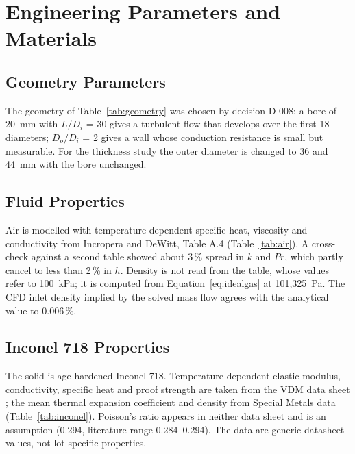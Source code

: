 \chapter{Engineering Parameters and Materials}\label{ch:params}

\section{Geometry Parameters}
The geometry of Table~\ref{tab:geometry} was chosen by decision D-008: a bore of 20~mm with $L/D_i$ = 30 gives a turbulent flow that
develops over the first 18 diameters; $D_o/D_i$ = 2 gives a wall whose conduction resistance is small but measurable. For the thickness
study the outer diameter is changed to 36 and 44~mm with the bore unchanged.

\section{Fluid Properties}
Air is modelled with temperature-dependent specific heat, viscosity and conductivity from Incropera and DeWitt, Table A.4 \cite{incropera}
(Table~\ref{tab:air}). A cross-check against a second table \cite{cengel} showed about 3\,\% spread in $k$ and $Pr$, which partly cancel to
less than 2\,\% in $h$. Density is not read from the table, whose values refer to 100~kPa; it is computed from Equation~\eqref{eq:idealgas}
at 101,325~Pa. The CFD inlet density implied by the solved mass flow agrees with the analytical value to 0.006\,\%.



\section{Inconel 718 Properties}
The solid is age-hardened Inconel 718. Temperature-dependent elastic modulus, conductivity, specific heat and proof strength are taken from
the VDM data sheet \cite{vdm718}; the mean thermal expansion coefficient and density from Special Metals data \cite{htm718}
(Table~\ref{tab:inconel}). Poisson's ratio appears in neither data sheet and is an assumption (0.294, literature range 0.284--0.294). The
data are generic datasheet values, not lot-specific properties.



